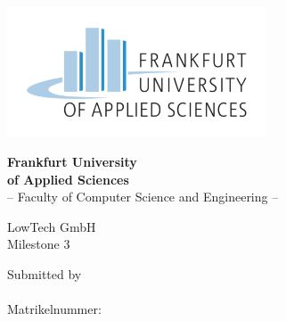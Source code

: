 \thispagestyle{empty}
\begin{titlepage}


  \vspace*{-3,5cm}
  \begin{center}
    \includegraphics[width=7.7cm]{Images/fra-uas_logo} \\ 
  \end{center}

  \begin{center}
    \vspace{0.1cm}
    \LARGE \textbf{Frankfurt University\\ of Applied Sciences}\\
    \vspace{0.4cm}
    \Large -- Faculty of Computer Science and Engineering --
  \end{center}

  \vfill

  \begin{center}
    \huge \textbf{\ThesisTitle}    
  \end{center} 

  \vfill

  \begin{center}
    \Large LowTech GmbH\\
    \vspace{0.3cm}
    \Large Milestone 3  
  \end{center}


  \vfill

  \begin{center}
    \Large Submitted by\\ 
    \vspace{0.3cm}
    \Large \textbf{\myName}\\
    \vspace{0.3cm}
    \normalsize Matrikelnummer: \myStudentId   
  \end{center}


  \vfill




\newpage


  

\end{titlepage}